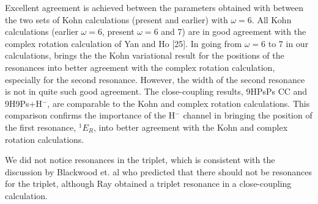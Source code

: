\documentclass[preprint,showpacs,preprintnumbers,amsmath,amssymb]{revtex4}
\begin{document}
Excellent agreement is achieved between the
parameters obtained with between the two sets
of Kohn calculations (present and earlier) with
$\omega =6$.
All Kohn calculations (earlier $\omega=6$, present $\omega=6$ and 7)
are in good agreement with the complex rotation calculation
of Yan and Ho [25].
In going from $\omega=6$ to 7 in our calculations, brings the 
the Kohn variational result for the positions
of the resonances into better agreement with
the complex rotation calculation, especially 
for the second resonance.
However, the width of the second resonance is not
in quite such good agreement.
The close-coupling results, 9HPsPs CC and 9H9Ps+H$^-$,
are comparable to the Kohn and complex rotation calculations.
This comparison confirms the importance of the H$^-$
channel in bringing the position of the first resonance,
$^1E_R$, into better agreement with the Kohn
and complex rotation calculations.

We did not notice  resonances in the triplet, which
is consistent with the discussion by Blackwood et. al \cite{}
who predicted that there should not be resonances
for the triplet,  although Ray \cite{} obtained a triplet resonance
in a close-coupling calculation.
\end{document}

